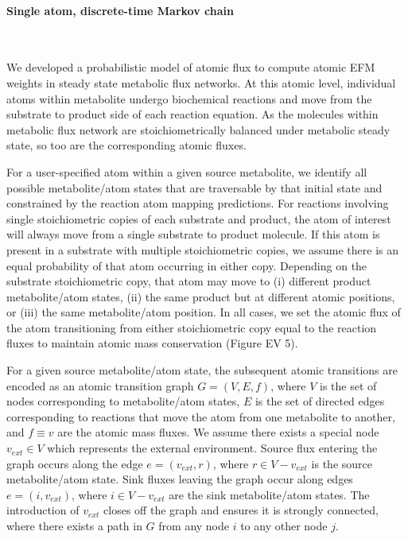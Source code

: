 \documentclass[12pt]{article}
\begin{document}

\paragraph*{Single atom, discrete-time Markov chain}

\hspace*{0.1cm}\\\noindent

We developed a probabilistic model of atomic flux to compute atomic EFM
weights in steady state metabolic flux networks. At this atomic level,
individual atoms within metabolite undergo biochemical reactions and move
from the substrate to product side of each reaction equation. As the
molecules within metabolic flux network are stoichiometrically balanced
under metabolic steady state, so too are the corresponding atomic fluxes.

For a user-specified atom within a given source metabolite, we identify
all possible metabolite/atom states that are traversable by that initial
state and constrained by the reaction atom mapping predictions. For
reactions involving single stoichiometric copies of each substrate and
product, the atom of interest will always move from a single substrate to
product molecule. If this atom is present in a substrate with multiple
stoichiometric copies, we assume there is an equal probability of that
atom occurring in either copy. Depending on the substrate stoichiometric
copy, that atom may move to (i) different product metabolite/atom states,
(ii) the same product but at different atomic positions, or (iii) the same
metabolite/atom position. In all cases, we set the atomic flux of the atom
transitioning from either stoichiometric copy equal to the reaction fluxes
to maintain atomic mass conservation (Figure EV 5).

For a given source metabolite/atom state, the subsequent atomic
transitions are encoded as an atomic transition graph $G = (V, E, f)$,
where $V$ is the set of nodes corresponding to
metabolite/atom states, $E$ is the set of directed edges corresponding to
reactions that move the atom from one metabolite to another, and $f \equiv
v$ are the atomic mass fluxes. We assume there exists a special node $v_{ext} \in V$
which represents the external environment. Source flux entering the graph
occurs along the edge $e = (v_{ext}, r)$, where $r \in V - v_{ext}$ is the
source metabolite/atom state. Sink fluxes leaving the graph occur along
edges $e = (i, v_{ext})$, where $i \in V - v_{ext}$ are the sink
metabolite/atom states. The introduction of $v_{ext}$ closes off the graph
and ensures it is strongly connected, where there exists a path in $G$
from any node $i$ to any other node $j$.
\end{document}
